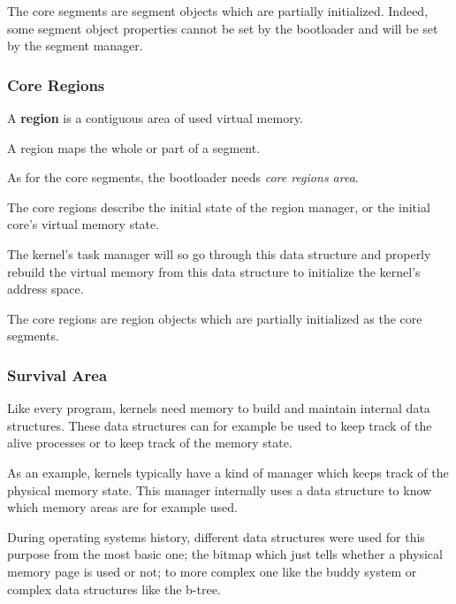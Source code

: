 The core segments are segment objects which are partially
initialized. Indeed, some segment object properties cannot be set
by the bootloader and will be set by the segment manager.


%
%

\subsubsection{Core Regions}

A \textbf{region} is a contiguous area of used virtual memory.

A region maps the whole or part of a segment.

As for the core segments, the bootloader needs \textit{core regions area}.

The core regions describe the initial state of the region manager, or
the initial core's virtual memory state.

The kernel's task manager will so go through this data structure
and properly rebuild the virtual memory from this data structure to
initialize the kernel's address space.

The core regions are region objects which are partially initialized
as the core segments.


%
%

\subsubsection{Survival Area}

Like every program, kernels need memory to build and maintain internal
data structures. These data structures can for example be used to keep
track of the alive processes or to keep track of the memory state.

As an example, kernels typically have a kind of manager which keeps track
of the physical memory state. This manager internally uses a data
structure to know which memory areas are for example used.

During operating systems history, different data structures were used for
this purpose from the most basic one; the bitmap which just tells whether
a physical memory page is used or not; to more complex one like the buddy
system or complex data structures like the b-tree.

